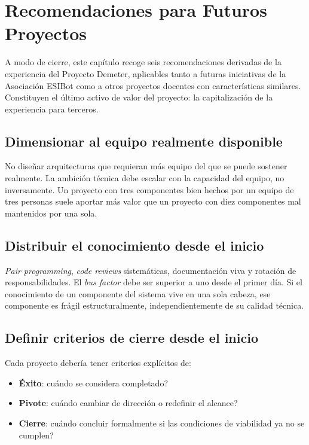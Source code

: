 \chapter{Recomendaciones para Futuros Proyectos}
\label{cap:recomendaciones}

A modo de cierre, este cap\'itulo recoge seis recomendaciones derivadas
de la experiencia del Proyecto Demeter, aplicables tanto a futuras
iniciativas de la Asociaci\'on ESIBot como a otros proyectos docentes
con caracter\'isticas similares. Constituyen el \'ultimo activo de
valor del proyecto: la capitalizaci\'on de la experiencia para terceros.

\section{Dimensionar al equipo realmente disponible}

No dise\~nar arquitecturas que requieran m\'as equipo del que se puede
sostener realmente. La ambici\'on t\'ecnica debe escalar con la
capacidad del equipo, no inversamente. Un proyecto con tres componentes
bien hechos por un equipo de tres personas suele aportar m\'as valor
que un proyecto con diez componentes mal mantenidos por una sola.

\section{Distribuir el conocimiento desde el inicio}

\textit{Pair programming}, \textit{code reviews} sistem\'aticas,
documentaci\'on viva y rotaci\'on de responsabilidades. El \textit{bus
factor} debe ser superior a uno desde el primer d\'ia. Si el conocimiento
de un componente del sistema vive en una sola cabeza, ese componente
es fr\'agil estructuralmente, independientemente de su calidad t\'ecnica.

\section{Definir criterios de cierre desde el inicio}

Cada proyecto deber\'ia tener criterios expl\'icitos de:

\begin{itemize}[leftmargin=*]
    \item \textbf{\'Exito}: \textquestiondown cu\'ando se considera completado?
    \item \textbf{Pivote}: \textquestiondown cu\'ando cambiar de
    direcci\'on o redefinir el alcance?
    \item \textbf{Cierre}: \textquestiondown cu\'ando concluir formalmente
    si las condiciones de viabilidad ya no se cumplen?
\end{itemize}

